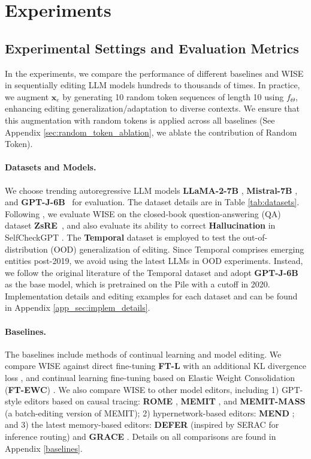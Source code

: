 \section{Experiments}\label{sec:exp}

\subsection{Experimental Settings and Evaluation Metrics} \label{subsec:exp_setting}
In the experiments, we compare the performance of different baselines and WISE in sequentially editing LLM models hundreds to thousands of times. In practice, we augment $\mathbf{x}_e$ by generating 10 random token sequences of length 10 using $f_{\Theta}$, enhancing editing generalization/adaptation to diverse contexts. We ensure that this augmentation with random tokens is applied across all baselines (See Appendix \ref{sec:random_token_ablation}, we ablate the contribution of Random Token).


\paragraph{Datasets and Models.} 
We choose trending autoregressive LLM models \textbf{LLaMA-2-7B} \cite{llama-2},  \textbf{Mistral-7B} \cite{mistral}, and \textbf{GPT-J-6B}~\cite{gpt-1,gpt-j} for evaluation. The dataset details are in Table \ref{tab:datasets}. Following \cite{grace}, we evaluate WISE on the closed-book question-answering (QA) dataset \textbf{ZsRE}~\cite{zsre}, and also evaluate its ability to correct \textbf{Hallucination} in SelfCheckGPT \cite{selfcheckgpt}.
The \textbf{Temporal} dataset \cite{canonical_examples} is employed to test the out-of-distribution (OOD) generalization of editing. 
Since Temporal comprises emerging entities post-2019, we avoid using the latest LLMs in OOD experiments.
Instead, we follow the original literature of the Temporal dataset \cite{canonical_examples} and adopt \textbf{GPT-J-6B} as the base model, which is pretrained on the Pile \cite{pile} with a cutoff in 2020.
Implementation details and editing examples for each dataset and can be found in Appendix \ref{app_sec:implem_details}.

\paragraph{Baselines.} 
The baselines include methods of continual learning and model editing.
We compare WISE against direct fine-tuning \textbf{FT-L} with an additional KL divergence loss \cite{rome}, and continual learning fine-tuning based on Elastic Weight Consolidation (\textbf{FT-EWC}) \cite{ewc}.
We also compare WISE to other model editors, including 1) GPT-style editors based on causal tracing: \textbf{ROME} \cite{rome}, \textbf{MEMIT} \cite{memit}, and \textbf{MEMIT-MASS} (a batch-editing version of MEMIT); 2) hypernetwork-based editors: \textbf{MEND} \cite{mend};
and 3) the latest memory-based editors: \textbf{DEFER} (inspired by SERAC \cite{serac} for inference routing) and \textbf{GRACE} \cite{grace}. Details on all comparisons are found in Appendix \ref{baselines}.

